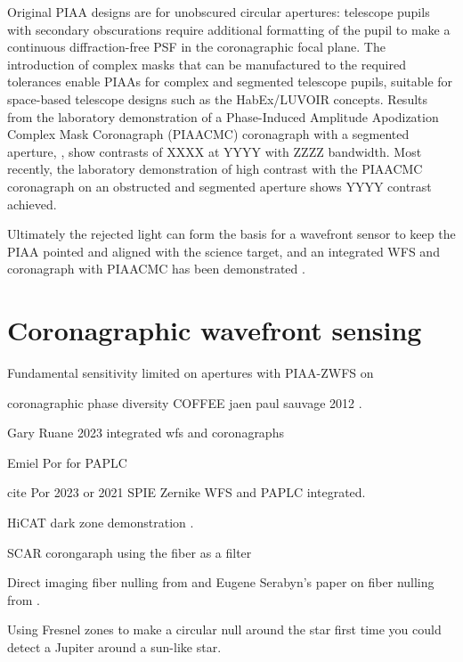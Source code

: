 \documentclass[letterpaper]{ar-1col}
\begin{document}
%
Original PIAA designs are for unobscured circular apertures: telescope pupils with secondary obscurations require additional formatting of the pupil to make a continuous diffraction-free PSF in the coronagraphic focal plane.
%
The introduction of complex masks that can be manufactured to the required tolerances enable PIAAs for complex and segmented telescope pupils, suitable for space-based telescope designs such as the HabEx/LUVOIR concepts.
%
Results from the laboratory demonstration of a Phase-Induced Amplitude Apodization Complex Mask Coronagraph (PIAACMC) coronagraph with a segmented aperture, \citep{Marx21}, show contrasts of XXXX at YYYY with ZZZZ bandwidth.
%
Most recently, the laboratory demonstration of high contrast with the PIAACMC coronagraph on an obstructed and segmented aperture \citep{Belikov22} shows YYYY contrast achieved.

Ultimately the rejected light can form the basis for a wavefront sensor to keep the PIAA pointed and aligned with the science target, and an integrated WFS and coronagraph with PIAACMC has been demonstrated \citep{Haffert23a}.

\section{Coronagraphic wavefront sensing}


Fundamental sensitivity limited on apertures with PIAA-ZWFS on \citet{Haffert23}

coronagraphic phase diversity
COFFEE jaen paul sauvage 2012 \citep{Sauvage12}.


Gary Ruane 2023 integrated wfs and coronagraphs \citep{Ruane23}

Emiel Por for PAPLC \citep{Por20}

cite Por 2023 or 2021 SPIE Zernike WFS and PAPLC integrated. \citep{Pourcelot22,Pourcelot23}

HiCAT dark zone demonstration \citep{Soummer22}.

SCAR corongaraph using the fiber as a filter \citep{Haffert20}

Direct imaging fiber nulling from \citet{Mawet17} and Eugene Serabyn's paper on fiber nulling from \citet{Serabyn06}.

Using Fresnel zones to make a circular null around the star \citep{Angel86} first time you could detect a Jupiter around a sun-like star.
\end{document}
